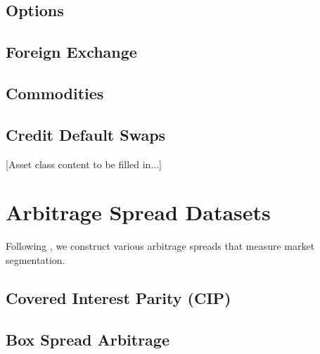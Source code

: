 \documentclass{article}
\begin{document}
\subsection{Options}
\label{sec:options}

\subsection{Foreign Exchange}
\label{sec:fx}

\subsection{Commodities}
\label{sec:commodities}

\subsection{Credit Default Swaps}
\label{sec:cds}

[Asset class content to be filled in...]

\section{Arbitrage Spread Datasets}
\label{sec:arbitrage}


Following \cite{Siriwardane2021}, we construct various arbitrage spreads that measure market segmentation.

\subsection{Covered Interest Parity (CIP)}

\subsection{Box Spread Arbitrage}
\end{document}
